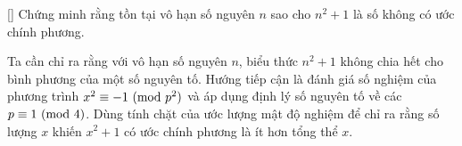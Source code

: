 \documentclass[../08-quadratic-residues.tex]{subfiles}
\begin{document}
\begin{example*}\label{example:CHN-2015-TST2-D3}[\textbf{}]
    Chứng minh rằng tồn tại vô hạn số nguyên \( n \) sao cho \( n^2 + 1 \) là số không có ước chính phương.
\end{example*}

\begin{story*}
    Ta cần chỉ ra rằng với vô hạn số nguyên \( n \), biểu thức \( n^2 + 1 \) không chia hết cho bình phương của một số nguyên tố.
    Hướng tiếp cận là đánh giá số nghiệm của phương trình \( x^2 \equiv -1 \ (\mathrm{mod}\ p^2) \) và áp dụng định lý số nguyên tố về các \( p \equiv 1 \ (\mathrm{mod}\ 4) \).
    Dùng tính chặt của ước lượng mật độ nghiệm để chỉ ra rằng số lượng \( x \) khiến \( x^2 + 1 \) có ước chính phương là ít hơn tổng thể \( x \).
\end{story*}
\end{document}
